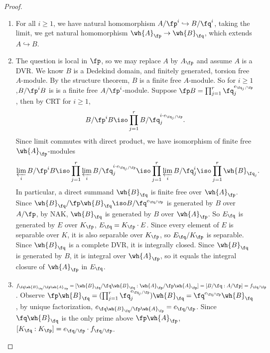 \documentclass[11pt]{amsart}
\begin{document}
\begin{proof}
    \begin{enumerate}
        \item For all $i \geq 1$, we have natural homomorphism $A/\fp^i
            \hookrightarrow B/\fq^i$, taking the limit, we get natural
            homomorphism $\wh{A}_\fp \to \wh{B}_\fq$, which extends $A
            \hookrightarrow B$.
        \item The question is local in $\fp$, so we may replace $A$ by $A_\fp$
            and assume $A$ is a DVR. We know $B$ is a Dedekind domain, and
            finitely generated, torsion free $A$-module.  By the structure
            theorem, $B$ is a finite free $A$-module.  So for $i \geq
            1$,$B/\fp^i B$ is is a finite free $A/\fp^i$-module.  Suppose $\fp
            B = \prod_{j = 1}^{r} \fq_j^{e_{\fq_j/\fp}}$, then by CRT for $i
            \geq 1$,
            \[
                B/\fp^i B \iso \prod_{j=1}^{r} B/\fq_j^{i \cdot e_{\fq_j/\fp}}.
            \]
            Since limit commutes with direct product, we have isomorphism of
            finite free $\wh{A}_{\fp}$-modules
            \[
                \varprojlim_i B/\fp^i B \iso
                \prod_{j=1}^{r} \varprojlim_i B/\fq_j^{i \cdot e_{\fq_j/\fp}} \iso
                \prod_{j=1}^{r} \varprojlim_i B/\fq_j^{i}
                \iso \prod_{j=1}^{r} \wh{B}_{\fq_j}.
            \]
            In particular, a direct summand $\wh{B}_\fq$ is finite free over
            $\wh{A}_\fp$.  Since $\wh{B}_\fq/\fp \wh{B}_\fq \iso
            B/\fq^{e_{\fq/\fp}}$ is generated by $B$ over $A/\fp$, by NAK,
            $\wh{B}_\fq$ is generated by $B$ over $\wh{A}_{\fp}$.  So $E_\fq$ is
            generated by $E$ over $K_\fp$, $E_\fq = K_\fp \cdot E$.  Since every
            element of $E$ is separable over $K$, it is also separable over
            $K_\fp$, so $E_\fq/K_\fp$ is separable.  Since $\wh{B}_\fq$ is a
            complete DVR, it is integrally closed.  Since $\wh{B}_\fq$ is
            generated by $B$, it is integral over $\wh{A}_\fp$, so it equals the
            integral closure of $\wh{A}_\fp$ in $E_\fq$.

        \item $f_{\fq\wh{B}_\fq/\fp\wh{A}_\fp} = [\wh{B}_\fq/\fq \wh{B}_\fq :
            \wh{A}_\fp / \fp \wh{A}_\fp] = [B/\fq : A/\fp] = f_{\fq/\fp}$.
            Observe $\fp \wh{B}_\fq = (\prod_{j=1}^r \fq_j^{e_{\fq_j/\fp}})
            \wh{B}_\fq = \fq^{e_{\fq/\fp}} \wh{B}_\fq$, by unique factorization,
            $e_{\fq\wh{B}_\fq/\fp\wh{A}_\fp} = e_{\fq/\fp}$.  Since $\fq
            \wh{B}_\fq$ is the only prime above $\fp \wh{A}_\fp$, $[K_\fq :
            K_\fp] = e_{\fq/\fp} \cdot f_{\fq/\fp}$.


\end{enumerate}
\end{proof}
\end{document}
